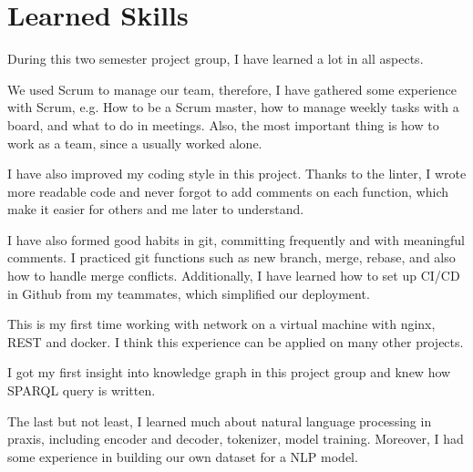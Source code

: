 
\section{Learned Skills}

During this two semester project group,
I have learned a lot in all aspects. 

We used Scrum to manage our team,
therefore, I have gathered some experience with Scrum, 
e.g. How to be a Scrum master, 
how to manage weekly tasks with a board, 
and what to do in meetings. 
Also, the most important thing is how to work as a team, 
since a usually worked alone. 

I have also improved my coding style in this project. 
Thanks to the linter, 
I wrote more readable code and never forgot to add comments on each function, 
which make it easier for others and me later to understand.

I have also formed good habits in git, 
committing frequently and with meaningful comments. 
I practiced git functions such as new branch, merge, rebase, 
and also how to handle merge conflicts. 
Additionally, I have learned how to set up CI/CD in Github from my teammates, 
which simplified our deployment.

This is my first time working with network on a virtual machine
with nginx, REST and docker. 
I think this experience can be applied on many other projects. 

I got my first insight into knowledge graph in this project group
and knew how SPARQL query is written. 

The last but not least,
I learned much about natural language processing in praxis, 
including encoder and decoder, tokenizer, model training. 
Moreover, I had some experience in building our own dataset for a NLP model. 